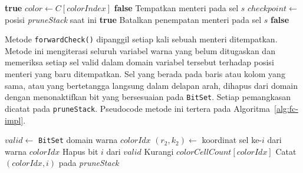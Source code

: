 \begin{algorithm}[!htbp]
	\caption{Prosedur rekursif \texttt{placeQueens} pada kelas \texttt{BacktrackingSolverAC3}}
	\label{alg:backtracking}
	\begin{algorithmic}[1]
		\State \Return \textbf{true} 
		\EndIf
		\State $color \gets C[colorIndex]$
		\State \Return \textbf{false} 
		\EndIf
		\State Tempatkan menteri pada sel $s$
		\State $checkpoint \gets$ posisi \textit{pruneStack} saat ini
		\State {}
		\State {}
		\State \Return \textbf{true}
		\EndIf
		\EndIf
		\State {}
		\State Batalkan penempatan menteri pada sel $s$
		\EndFor
		\State \Return \textbf{false}
		\EndFunction
	\end{algorithmic}
\end{algorithm}

Metode \texttt{forwardCheck()} dipanggil setiap kali sebuah menteri ditempatkan. Metode ini mengiterasi seluruh variabel warna yang belum ditugaskan dan memeriksa setiap sel valid dalam domain variabel tersebut terhadap posisi menteri yang baru ditempatkan. Sel yang berada pada baris atau kolom yang sama, atau yang bertetangga langsung dalam delapan arah, dihapus dari domain dengan menonaktifkan bit yang bersesuaian pada \texttt{BitSet}. Setiap pemangkasan dicatat pada \texttt{pruneStack}. Pseudocode metode ini tertera pada Algoritma~\ref{alg:fc-impl}.


\begin{algorithm}[!htbp]
	\caption{Prosedur \texttt{forwardCheck} pada kelas \texttt{BacktrackingSolverAC3}}
	\label{alg:fc-impl}
	\begin{algorithmic}[1]
		\State $valid \gets$ \texttt{BitSet} domain warna $colorIdx$
		\State $(r_2, k_2) \gets$ koordinat sel ke-$i$ dari warna $colorIdx$
		\State Hapus bit $i$ dari $valid$
		\State Kurangi $colorCellCount[colorIdx]$
		\State Catat $(colorIdx, i)$ pada \textit{pruneStack}
		\EndIf
		\EndFor
		\EndFor
		\EndFunction
	\end{algorithmic}
\end{algorithm}

